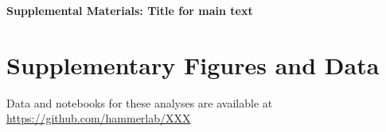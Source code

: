 
\pagebreak
\widetext
\begin{center}
\textbf{\large Supplemental Materials: Title for main text}
\end{center}

\setcounter{equation}{0}
\setcounter{figure}{0}
\setcounter{table}{0}
\setcounter{page}{1}
\makeatletter
\renewcommand{\theequation}{S\arabic{equation}}
\renewcommand{\thefigure}{S\arabic{figure}}
\renewcommand{\bibnumfmt}[1]{[S#1]}
\renewcommand{\citenumfont}[1]{S#1}

\section*{Supplementary Figures and Data}

Data and notebooks for these analyses are available at \url{https://github.com/hammerlab/XXX}


